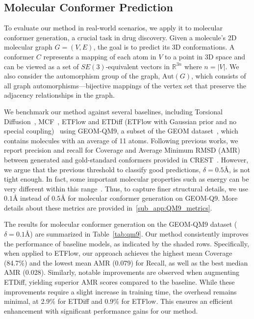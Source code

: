 \subsection{Molecular Conformer Prediction}

To evaluate our method in real-world scenarios, we apply it to molecular conformer generation, a crucial task in drug discovery. Given a molecule's 2D molecular graph \(G=(V,E)\), the goal is to predict its 3D conformations. A conformer \(C\) represents a mapping of each atom in \(V\) to a point in 3D space and can be viewed as a set of \(SE(3)\)-equivalent vectors in \(\mathbb{R}^{3n}\) where \(n=|V|\). We also consider the automorphism group of the graph, \(\text{Aut}(G)\), which consists of all graph automorphisms—bijective mappings of the vertex set that preserve the adjacency relationships in the graph.



We benchmark our method against several baselines, including Torsional Diffusion~, MCF~, ETFlow and ETDiff (ETFlow with Gaussian prior and no special coupling)~ using GEOM-QM9, a subset of the GEOM dataset~, which contains molecules with an average of 11 atoms. Following previous works, we report precision and recall for Coverage and Average Minimum RMSD (AMR) between generated and gold-standard conformers provided in CREST~. However, we argue that the previous threshold to classify good predictions, \(\delta = 0.5\text{\AA}\), is not tight enough. In fact, some important molecular properties such as energy can be very different within this range~. Thus, to capture finer structural details, we use \(0.1\text{\AA}\) instead of \(0.5\text{\AA}\) for molecular conformer generation on GEOM-Q9. More details about these metrics are provided in~\cref{sub_app:QM9_metrics}.


The results for molecular conformer generation on the GEOM-QM9 dataset ($\delta = 0.1\text{\AA}$) are summarized in Table~\ref{tab:qm9}. Our method consistently improves the performance of baseline models, as indicated by the shaded rows. Specifically, when applied to ETFlow, our approach achieves the highest mean Coverage (84.7\%) and the lowest mean AMR (0.079) for Recall, as well as the best median AMR (0.028). Similarly, notable improvements are observed when augmenting ETDiff, yielding superior AMR scores compared to the baseline. 
While these improvements require a slight increase in training time, the overhead remains minimal, at 2.9\% for ETDiff and 0.9\% for ETFlow. This ensures an efficient enhancement with significant performance gains for our method.

% 



